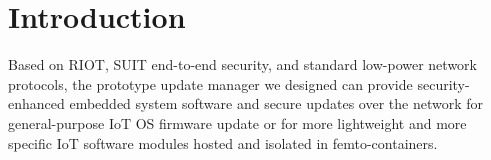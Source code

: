 \documentclass[../main.tex]{subfiles}
\begin{document}

\section*{Introduction}

Based on RIOT, SUIT end-to-end security, and standard low-power network protocols,
the prototype update manager we designed can provide security-enhanced embedded system software and secure updates over the network for general-purpose IoT OS firmware update or for more lightweight and more specific IoT software modules hosted and isolated in femto-containers.
\end{document}
